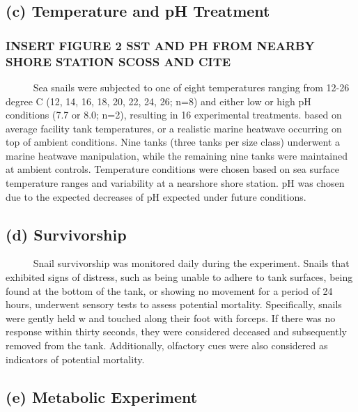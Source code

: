 \documentclass[
  12pt,
]{article}
\begin{document}
\hypertarget{c-temperature-and-ph-treatment}{%
\subsection{(c) Temperature and pH
Treatment}\label{c-temperature-and-ph-treatment}}

\hypertarget{insert-figure-2-sst-and-ph-from-nearby-shore-station-scoss-and-cite}{%
\subsubsection{INSERT FIGURE 2 SST AND PH FROM NEARBY SHORE STATION
SCOSS AND
CITE}\label{insert-figure-2-sst-and-ph-from-nearby-shore-station-scoss-and-cite}}

~~~~~ Sea snails were subjected to one of eight temperatures ranging
from 12-26 degree C (12, 14, 16, 18, 20, 22, 24, 26; n=8) and either low
or high pH conditions (7.7 or 8.0; n=2), resulting in 16 experimental
treatments. based on average facility tank temperatures, or a realistic
marine heatwave occurring on top of ambient conditions. Nine tanks
(three tanks per size class) underwent a marine heatwave manipulation,
while the remaining nine tanks were maintained at ambient controls.
Temperature conditions were chosen based on sea surface temperature
ranges and variability at a nearshore shore station. pH was chosen due
to the expected decreases of pH expected under future conditions.

\hypertarget{d-survivorship}{%
\subsection{(d) Survivorship}\label{d-survivorship}}

~~~~~ Snail survivorship was monitored daily during the experiment.
Snails that exhibited signs of distress, such as being unable to adhere
to tank surfaces, being found at the bottom of the tank, or showing no
movement for a period of 24 hours, underwent sensory tests to assess
potential mortality. Specifically, snails were gently held w and touched
along their foot with forceps. If there was no response within thirty
seconds, they were considered deceased and subsequently removed from the
tank. Additionally, olfactory cues were also considered as indicators of
potential mortality.

\hypertarget{e-metabolic-experiment}{%
\subsection{(e) Metabolic Experiment}\label{e-metabolic-experiment}}
\end{document}

